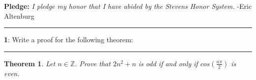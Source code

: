 \documentclass[11pt]{article}
\newtheorem{theorem}{Theorem}
\newcommand\question[2]{\vspace{.25in}\hrule\textbf{#1}: #2\vspace{.5em}\hrule\vspace{.10in}}
\newcommand{\Z}{\mathbb{Z}}
\begin{document}
\raggedright
\newcommand\NAME{Eric Altenburg}  %
\newcommand\COURSE{MA-240}
\newcommand\HWNUM{2}              %


\textbf{Pledge:} \textit{I pledge my honor that I have abided by the Stevens Honor System.} -Eric Altenburg

\question{1}{Write a proof for the following theorem:}

\begin{theorem}
	Let $n \in \Z$. Prove that $2n^2+n$ is odd if and only if $cos(\frac{n \pi}{2})$ is even.
\end{theorem}
\end{document}
